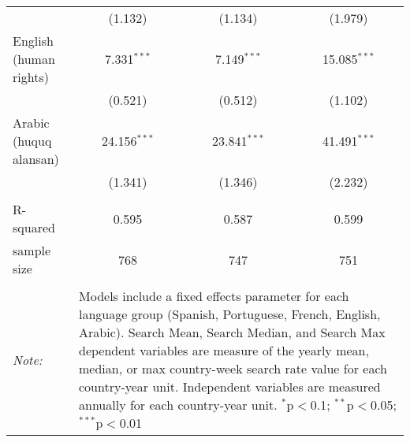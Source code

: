 \begin{table}[!htbp]
\begin{tabular}{@{\extracolsep{5pt}}lccc}
  & (1.132) & (1.134) & (1.979) \\ 
  English (human rights) & 7.331$^{***}$ & 7.149$^{***}$ & 15.085$^{***}$ \\ 
  & (0.521) & (0.512) & (1.102) \\ 
  Arabic (huquq alansan) & 24.156$^{***}$ & 23.841$^{***}$ & 41.491$^{***}$ \\ 
  & (1.341) & (1.346) & (2.232) \\ 
 \hline \\[-1.8ex] 
R-squared  & 0.595 & 0.587 & 0.599 \\ 
sample size  & 768 & 747 & 751 \\ 
\hline 
\hline \\[-1.8ex] 
\textit{Note:}  & \multicolumn{3}{l}{\parbox[t]{8cm}{Models include a fixed effects parameter for each language group (Spanish, Portuguese, French, English, Arabic). Search Mean, Search Median, and Search Max dependent variables are measure of the yearly mean, median, or max country-week search rate value for each country-year unit. Independent variables are measured annually for each country-year unit. $^{*}$p$<$0.1; $^{**}$p$<$0.05; $^{***}$p$<$0.01}} \\ 
\end{tabular} 
\end{table} 
